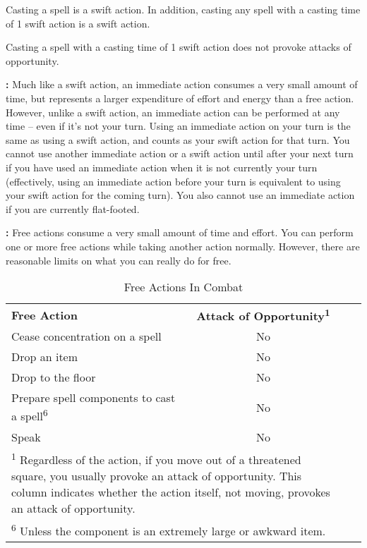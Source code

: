 Casting a  spell is a swift action. In addition, casting any spell 
with a casting time of 1 swift action is a swift action.

Casting a spell with a casting time of 1 swift action does not provoke 
attacks of opportunity. 

\textbf{:} Much like a swift action, an immediate action consumes 
a very small amount of time, but represents a larger expenditure of effort and 
energy than a free action. However, unlike a swift action, an immediate action 
can be performed at any time -- even if it's not your turn. Using an immediate action 
on your turn is the same as using a swift action, and counts as your swift action 
for that turn. You cannot use another immediate action or a swift action until 
after your next turn if you have used an immediate action when it is not currently 
your turn (effectively, using an immediate action before your turn is equivalent 
to using your swift action for the coming turn). You also cannot use an immediate 
action if you are currently flat-footed.

\textbf{:} Free actions consume a very small amount of time and effort. 
You can perform one or more free actions while taking another action normally. 
However, there are reasonable limits on what you can really do for free.

\begin{table}[htb]
\caption{Free Actions In Combat}
\centering
\begin{tabular}{l c l c}
\textbf{Free Action} & \textbf{Attack of Opportunity\textsuperscript{1}}\\
Cease concentration on a spell & No\\
Drop an item & No\\
Drop to the floor & No\\
Prepare spell components to cast a spell\textsuperscript{6} & No\\
Speak & No\\
\multicolumn{2}{p{12.5cm}}{\textsuperscript{1} Regardless of the action, if you move out of a threatened square, you usually provoke an attack of opportunity. This column indicates whether the action itself, not moving, provokes an attack of opportunity.}\\
\multicolumn{2}{p{12.5cm}}{\textsuperscript{6} Unless the component is an extremely large or awkward item.}\\
\end{tabular}
\end{table}

